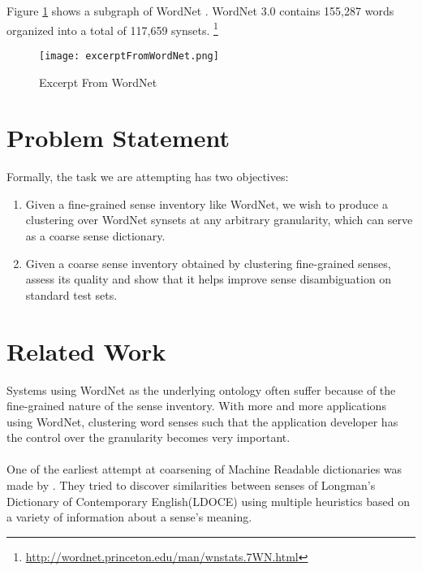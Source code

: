 Figure \ref{fig:excerptFromWordNet} shows a subgraph of WordNet \citep{navigli2009WSDSurvey}. WordNet 3.0 contains 155,287 words organized into a total of 117,659 synsets. \footnote{\url{http://wordnet.princeton.edu/man/wnstats.7WN.html}}

\begin{figure}[h]
\begin{center}
\texttt{[image: excerptFromWordNet.png]}
\caption{Excerpt From WordNet}
\label{fig:excerptFromWordNet}
\end{center}
\end{figure}

\section{Problem Statement}
Formally, the task we are attempting has two objectives: 
\begin{enumerate}
\item Given a fine-grained sense inventory like WordNet, we wish to produce a clustering over WordNet synsets at any arbitrary granularity, which can serve as a coarse sense dictionary. 
\item Given a coarse sense inventory obtained by clustering fine-grained senses, assess its quality and show that it helps improve sense disambiguation on standard test sets.
\end{enumerate}

\section{Related Work}
\label{chapter:Background}
Systems using WordNet as the underlying ontology often suffer because of the fine-grained nature of the sense inventory. With more and more applications using WordNet, clustering word senses such that the application developer has the control over the granularity becomes very important.

\paragraph{}
One of the earliest attempt at coarsening of Machine Readable dictionaries was made by \citep{Dolan:1994}. 
They tried to discover similarities between senses of Longman's Dictionary of Contemporary English(LDOCE) using multiple heuristics based on a variety of information about a sense's meaning.

